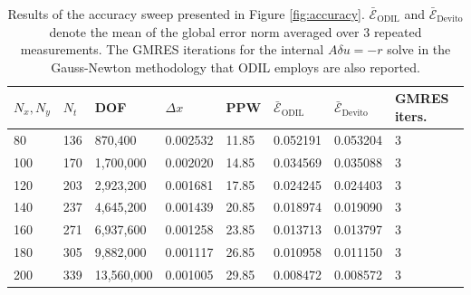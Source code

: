 \documentclass[final-report]{report-template}
\begin{document}
\begin{table}[!htp]
    \centering    
    \begin{tabular}{llllllll}
        \toprule
        $N_x, N_y$ & $N_t$ & DOF & $\Delta x$ & PPW & $\bar{\mathcal{E}}_\text{ODIL}$ & $\bar{\mathcal{E}}_\text{Devito}$ & GMRES iters. \\
        \midrule
    80 & 136 & 870,400 & 0.002532 & 11.85 & 0.052191 & 0.053204 & 3\\	
    100 & 170 &	1,700,000	& 0.002020 & 14.85 & 0.034569 & 0.035088 & 3 \\	
    120 & 203 &2,923,200 & 0.001681 & 17.85 & 0.024245 & 0.024403 & 3 \\
    140 & 237 & 4,645,200	& 0.001439 & 20.85 & 0.018974 & 0.019090 & 3 \\
    160	& 271 & 6,937,600	& 0.001258 & 23.85 & 0.013713 & 0.013797 & 3 \\	
    180	& 305 & 9,882,000	& 0.001117 & 26.85 & 0.010958 & 0.011150 & 3 \\
    200	& 339 & 13,560,000 & 0.001005 & 29.85 & 0.008472 & 0.008572 & 3 \\
        \bottomrule
    \end{tabular}
    \caption{Results of the accuracy sweep presented in Figure \ref{fig:accuracy}. $\bar{\mathcal{E}}_\text{ODIL}$ and $\bar{\mathcal{E}}_\text{Devito}$ denote the mean of the global error norm averaged over 3 repeated measurements. The GMRES iterations for the internal $A\delta u = -r$ solve in the Gauss-Newton methodology that ODIL employs are also reported.}
    \label{tab:accuracy}
\end{table}
\end{document}
